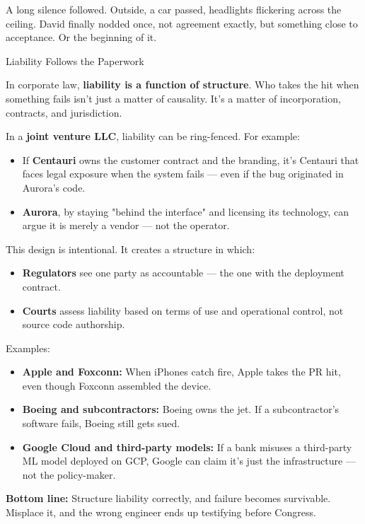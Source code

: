 A long silence followed. Outside, a car passed, headlights flickering across the ceiling. David finally nodded once, 
not agreement exactly, but something close to acceptance. Or the beginning of it.

\medskip

\begin{TechnicalSidebar}{Liability Follows the Paperwork}

  In corporate law, \textbf{liability is a function of structure}.  
  Who takes the hit when something fails isn’t just a matter of causality. It’s a matter of incorporation, contracts, 
  and jurisdiction.
  
  \medskip
  
  In a \textbf{joint venture LLC}, liability can be ring-fenced. For example:

  \medskip

  \begin{itemize}
    \item If \textbf{Centauri} owns the customer contract and the branding, it's Centauri that faces legal exposure when the 
    system fails — even if the bug originated in Aurora's code.
    \item \textbf{Aurora}, by staying "behind the interface" and licensing its technology, can argue it is merely a vendor — 
    not the operator.
  \end{itemize}
  
  \medskip
  
  This design is intentional.  
  It creates a structure in which:

  \medskip

  \begin{itemize}
    \item \textbf{Regulators} see one party as accountable — the one with the deployment contract.
    \item \textbf{Courts} assess liability based on terms of use and operational control, not source code authorship.
  \end{itemize}
  
  \medskip
  
  Examples:

  \medskip

  \begin{itemize}
    \item \textbf{Apple and Foxconn:} When iPhones catch fire, Apple takes the PR hit, even though Foxconn assembled the device.
    \item \textbf{Boeing and subcontractors:} Boeing owns the jet. If a subcontractor’s software fails, Boeing still gets sued.
    \item \textbf{Google Cloud and third-party models:} If a bank misuses a third-party ML model deployed on GCP, Google can claim it's just the infrastructure — not the policy-maker.
  \end{itemize}
  
  \medskip
  
  \textbf{Bottom line:}  
  Structure liability correctly, and failure becomes survivable.  
  Misplace it, and the wrong engineer ends up testifying before Congress.
  
\end{TechnicalSidebar}

